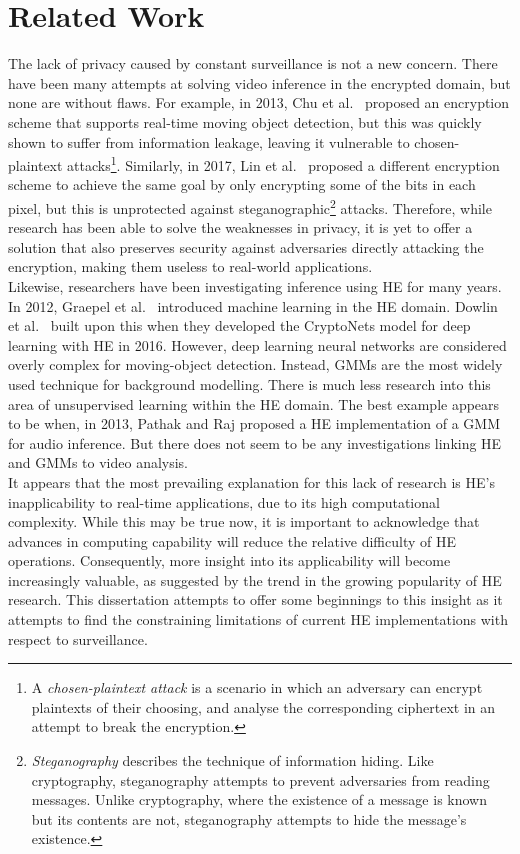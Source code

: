 \section{Related Work}
\label{sec:relatedWork}
\setlength{\leftskip}{0.25cm}
\indent \indent
The lack of privacy caused by constant surveillance is not a new concern. There have been many attempts at solving video inference in the encrypted domain, but none are without flaws. For example, in 2013, Chu et al.\ \cite{Chu} proposed an encryption scheme that supports real-time moving object detection, but this was quickly shown to suffer from information leakage, leaving it vulnerable to chosen-plaintext attacks\footnote{ A \textit{chosen-plaintext attack} is a scenario in which an adversary can encrypt plaintexts of their choosing, and analyse the corresponding ciphertext in an attempt to break the encryption. }. Similarly, in 2017, Lin et al.\ \cite{Lin} proposed a different encryption scheme to achieve the same goal by only encrypting some of the bits in each pixel, but this is unprotected against steganographic\footnote{\textit{Steganography} describes the technique of information hiding. Like cryptography, steganography attempts to prevent adversaries from reading messages. Unlike cryptography, where the existence of a message is known but its contents are not, steganography attempts to hide the message's existence.} attacks. Therefore, while research has been able to solve the weaknesses in privacy, it is yet to offer a solution that also preserves security against adversaries directly attacking the encryption, making them useless to real-world applications.
\smallskip \\ \indent
Likewise, researchers have been investigating inference using HE for many years. In 2012, Graepel et al.\ \cite{Graepel} introduced machine learning in the HE domain. Dowlin et al.\ \cite{Graepel} built upon this when they developed the CryptoNets model for deep learning with HE in 2016. However, deep learning neural networks are considered overly complex for moving-object detection. Instead, GMMs are the most widely used technique for background modelling. There is much less research into this area of unsupervised learning within the HE domain. The best example appears to be when, in 2013, Pathak and Raj \cite{Pathak} proposed a HE implementation of a GMM for audio inference. But there does not seem to be any investigations linking HE and GMMs to video analysis.
\smallskip \\ \indent
It appears that the most prevailing explanation for this lack of research is HE's inapplicability to real-time applications, due to its high computational complexity. While this may be true now, it is important to acknowledge that advances in computing capability will reduce the relative difficulty of HE operations. Consequently, more insight into its applicability will become increasingly valuable, as suggested by the trend in the growing popularity of HE research. This dissertation attempts to offer some beginnings to this insight as it attempts to find the constraining limitations of current HE implementations with respect to surveillance.

